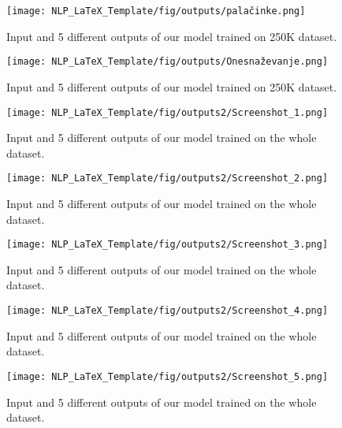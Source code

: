 \documentclass[fleqn,moreauthors,10pt]{ds_report}
\begin{document}
\begin{figure}[H]
    \centering
    \texttt{[image: NLP\_LaTeX\_Template/fig/outputs/palačinke.png]}
    \caption{Input and 5 different outputs of our model trained on 250K dataset. }
    \label{fig:output3}
\end{figure}


\begin{figure}[H]
    \centering
    \texttt{[image: NLP\_LaTeX\_Template/fig/outputs/Onesnaževanje.png]}
    \caption{Input and 5 different outputs of our model trained on 250K dataset.}
    \label{fig:output4}
\end{figure}


\begin{figure}[H]
    \centering
    \texttt{[image: NLP\_LaTeX\_Template/fig/outputs2/Screenshot\_1.png]}
    \caption{Input and 5 different outputs of our model trained on the whole dataset.}
    \label{fig:output5}
\end{figure}

\begin{figure}[H]
    \centering
    \texttt{[image: NLP\_LaTeX\_Template/fig/outputs2/Screenshot\_2.png]}
    \caption{Input and 5 different outputs of our model trained on the whole dataset.}
    \label{fig:output6}
\end{figure}

\begin{figure}[H]
    \centering
    \texttt{[image: NLP\_LaTeX\_Template/fig/outputs2/Screenshot\_3.png]}
    \caption{Input and 5 different outputs of our model trained on the whole dataset.}
    \label{fig:output7}
\end{figure}

\begin{figure}[H]
    \centering
    \texttt{[image: NLP\_LaTeX\_Template/fig/outputs2/Screenshot\_4.png]}
    \caption{Input and 5 different outputs of our model trained on the whole dataset.}
    \label{fig:output8}
\end{figure}

\begin{figure}[H]
    \centering
    \texttt{[image: NLP\_LaTeX\_Template/fig/outputs2/Screenshot\_5.png]}
    \caption{Input and 5 different outputs of our model trained on the whole dataset.}
    \label{fig:output9}
\end{figure}
\end{document}

